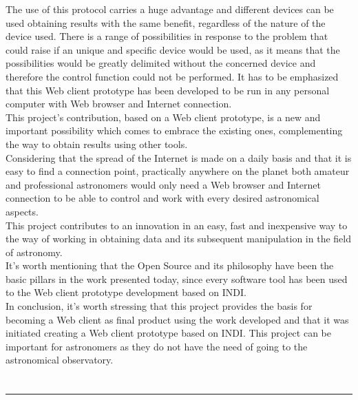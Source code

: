 The use of this protocol carries a huge advantage and different devices can be used obtaining results with the same benefit, regardless of the nature of the device used. There is a range of possibilities in response to the problem that could raise if an unique and specific device would be used, as it means that the possibilities would be greatly delimited without the concerned  device and therefore the control function could not be performed. It has to be emphasized that this Web client prototype has been developed to be run in any personal computer with Web browser and Internet connection.\\

This project’s contribution, based on a Web client prototype, is a new and important possibility which comes to embrace the existing ones, complementing the way to obtain results using other tools.\\

Considering that the spread of the Internet is made on a daily basis and that it is easy to find a connection point, practically anywhere on the planet both amateur and professional astronomers would only need a Web browser and Internet connection to be able to control and work with every desired astronomical aspects.\\

This project contributes to an innovation in an easy, fast and inexpensive way to the way of working in obtaining data and its subsequent manipulation in the field of astronomy.\\

It’s worth mentioning that the Open Source and its philosophy have been the basic pillars in the work presented today,  since every software tool has been used to the Web client prototype development based on INDI.\\

In conclusion, it’s worth stressing that this project provides the basis for becoming a Web client as final product using the work developed and that it was initiated creating a Web client prototype based on INDI. This project can be important for astronomers as they do not have the need of going to the astronomical observatory.

\chapter*{}
\thispagestyle{empty}

\noindent\rule[-1ex]{\textwidth}{2pt}\\[4.5ex]

